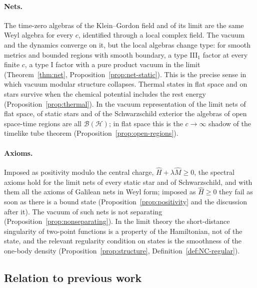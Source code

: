 \documentclass[%
 aip,
 jmp,
 amsmath,amssymb,
 reprint, onecolumn
]{revtex4-1}
\theoremstyle{definition}
\theoremstyle{remark}
\newcommand{\Hil}{\mathcal{H}}
\begin{document}
\paragraph{Nets.} The time-zero algebras of the Klein--Gordon field and
of its limit are the same Weyl algebra for every $c$, identified through
a local complex field. The vacuum and the dynamics converge on it, but
the local algebras change type: for smooth metrics and bounded regions
with smooth boundary, a type III$_1$ factor at every finite $c$, a type I
factor with a pure product vacuum in the limit (Theorem~\ref{thm:net},
Proposition~\ref{prop:net-static}). This is the precise sense in which
vacuum modular structure collapses. Thermal states in flat space and on
stars survive when the chemical potential includes the rest energy
(Proposition~\ref{prop:thermal}). In the vacuum representation of the
limit nets of flat space, of static stars and of the Schwarzschild
exterior the algebras of open space-time regions are all
$\mathcal{B}(\Hil)$; in flat space this is the
$c\to\infty$ shadow of the timelike tube theorem
(Proposition~\ref{prop:open-regions}).

\paragraph{Axioms.} Imposed as positivity modulo the central charge,
$\hat H+\lambda\hat M\geq0$, the spectral axioms hold for the limit nets
of every static star and of Schwarzschild, and with them all the axioms
of Galilean nets in Weyl form; imposed as $\hat H\geq0$ they fail as
soon as there is a bound state (Proposition~\ref{prop:positivity} and
the discussion after it). The
vacuum of such nets is not separating (Proposition~\ref{prop:nonseparating}).
In the limit theory the short-distance singularity of two-point
functions is a property of the Hamiltonian, not of the state, and the
relevant regularity condition on states is the smoothness of the
one-body density (Proposition~\ref{prop:structure},
Definition~\ref{def:NC-regular}).

\subsection{Relation to previous work}
\end{document}
